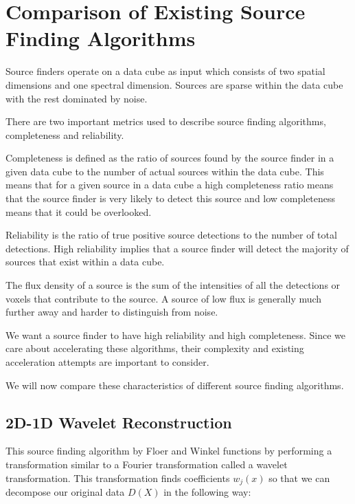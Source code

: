\documentclass[prodmode,acmtecs]{acmsmall} \usepackage[ruled]{algorithm2e}
\begin{document}
\section{Comparison of Existing Source Finding Algorithms}
    Source finders operate on a data cube as input which consists of two spatial dimensions
    and one spectral dimension. Sources are sparse within the data cube with the rest
    dominated by noise. \cite{walsh2012maser}

    There are two important metrics used to describe source finding algorithms, completeness and 
    reliability. \cite{popping2012comparison}

    Completeness is defined as the ratio of sources found by the source finder
    in a given data cube to the number of actual sources within the data cube. This means that
    for a given source in a data cube a high completeness ratio means that the source finder is 
    very likely to detect this source and low completeness means that it could be overlooked.

    Reliability
    is the ratio of true positive source detections to the number of total detections. High reliability
    implies that a source finder will detect the majority of sources that exist within a data cube. 

    The flux density of a source is the sum of the intensities of all the detections or voxels 
    that contribute to the source. A source of low flux is generally much further away and harder
    to distinguish from noise.

    We want a source finder to have high reliability and high completeness.
    Since we care about accelerating these algorithms, their complexity and existing 
    acceleration attempts are important to consider.

    
We will now compare these characteristics of different source finding algorithms.

 \cite{westerlund2012assessing}
 \cite{popping2012comparison}

    \subsection{2D-1D Wavelet Reconstruction}
    This source finding algorithm by Floer and Winkel functions by performing a transformation similar to a Fourier
    transformation called a wavelet transformation. This transformation finds coefficients $w_j(x)$
    so that we can decompose our original data $D(X)$ in the following way:
\end{document}
